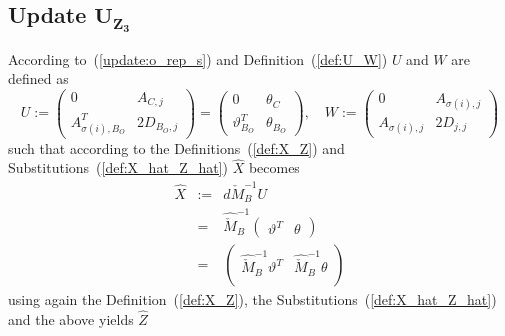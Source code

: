 \documentclass[a4paper]{article}
\begin{document}
\subsection{Update $\mathbf{U_{Z_{3}}}$}
According to~(\ref{update:o_rep_s}) and Definition~(\ref{def:U_W})
$U$ and $W$ are defined as
\begin{equation}
\label{def:U2}
U:=
\left(
\begin{array}{c|c}
 0                        & A_{C,j}  \\
\hline
A_{\sigma(i), B_{O}}^{T}  & 2D_{B_{O}, j}
\end{array}
\right)
=
\left(
\begin{array}{c|c}
0                     &  \theta_{C} \\
\hline
\vartheta_{B_{O}}^{T} & \theta_{B_{O}}
\end{array}
\right),
\quad
W:=
\left(
\begin{array}{c|c}
0                & A_{\sigma(i), j} \\
\hline
A_{\sigma(i), j} & 2D_{j,j}
\end{array}
\right)
\end{equation}
such that according to the Definitions~(\ref{def:X_Z}) and
Substitutions~(\ref{def:X_hat_Z_hat}) $\hat{X}$ becomes
\begin{eqnarray}
\hat{X}
&:=&
d\check{M}_{B}^{-1}U
\nonumber \\
&=&
\hat{\check{M}}_{B}^{-1}
\left(
\begin{array}{c|c}
\vartheta^{T} & \theta
\end{array}
\right)
\nonumber \\
&=&
\left(
\begin{array}{c|c}
\hat{\check{M}}_{B}^{-1}\vartheta^{T}
&
\hat{\check{M}}_{B}^{-1}\theta  \\
\end{array}
\right)
\end{eqnarray}
using again the Definition~(\ref{def:X_Z}), the
Substitutions~(\ref{def:X_hat_Z_hat}) and the above yields $\hat{Z}$
\end{document}
